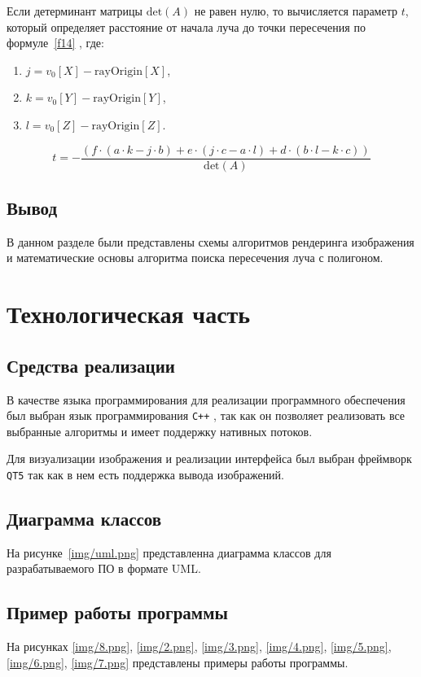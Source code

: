 Если детерминант матрицы \(\text{det}(A)\) не равен нулю, то вычисляется параметр \(t\), который определяет расстояние от начала луча до точки пересечения по формуле~\ref{f14} \cite{sherley}, где:
\begin{enumerate}
    \item \(j = v_0[X] - \text{rayOrigin}[X]\),
    \item \(k = v_0[Y] - \text{rayOrigin}[Y]\),
    \item \(l = v_0[Z] - \text{rayOrigin}[Z]\).
\end{enumerate}

\begin{equation}
t = - \frac{(f \cdot (a \cdot k - j \cdot b) + e \cdot (j \cdot c - a \cdot l) + d \cdot (b \cdot l - k \cdot c))}{\text{det}(A)}
\label{f14}
\end{equation}

\section{Вывод}
В данном разделе были представлены схемы алгоритмов рендеринга изображения и математические основы алгоритма поиска пересечения луча с полигоном.

\chapter{Технологическая часть}
\section{Средства реализации}
В качестве языка программирования для реализации программного
обеспечения был выбран язык программирования \texttt{C++} \cite{cpp}, так как он позволяет реализовать все выбранные алгоритмы и имеет поддержку нативных потоков.

Для визуализации изображения и реализации интерфейса был выбран фреймворк \texttt{QT5} \cite{qt5} так как в нем есть поддержка вывода изображений.

\section{Диаграмма классов}
На рисунке~\ref{img/uml.png} представленна диаграмма классов для разрабатываемого ПО в формате UML.

\section{Пример работы программы}
На рисунках \ref{img/8.png}, \ref{img/2.png}, \ref{img/3.png}, \ref{img/4.png}, \ref{img/5.png}, \ref{img/6.png}, \ref{img/7.png} представлены примеры работы программы.

